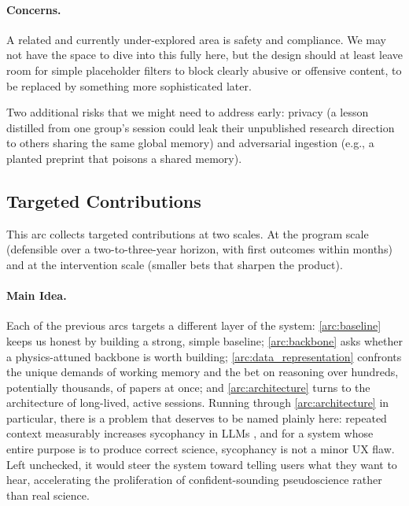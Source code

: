 \paragraph{Concerns.}
A related and currently under-explored area is safety and compliance. We may not have the space to dive into this fully here, but the design should at least leave room for simple placeholder filters to block clearly abusive or offensive content, to be replaced by something more sophisticated later.

Two additional risks that we might need to address early: privacy (a lesson distilled from one group's session could leak their unpublished research direction to others sharing the same global memory) and adversarial ingestion (e.g., a planted preprint that poisons a shared memory).


\subsection{Targeted Contributions}
\label{arc:targeted_contributions}
\label{arc:critique}  %

\begin{summarybox}
    This arc collects targeted contributions at two scales. At the program scale (defensible over a two-to-three-year horizon, with first outcomes within months) and at the intervention scale (smaller bets that sharpen the product).
\end{summarybox}

\paragraph{Main Idea.}
Each of the previous arcs targets a different layer of the system: \ref{arc:baseline} keeps us honest by building a strong, simple baseline; \ref{arc:backbone} asks whether a physics-attuned backbone is worth building; \ref{arc:data_representation} confronts the unique demands of working memory and the bet on reasoning over hundreds, potentially thousands, of papers at once; and \ref{arc:architecture} turns to the architecture of long-lived, active sessions. Running through \ref{arc:architecture} in particular, there is a problem that deserves to be named plainly here: repeated context measurably increases sycophancy in LLMs \cite{Jain2026}, and for a system whose entire purpose is to produce correct science, sycophancy is not a minor UX flaw. Left unchecked, it would steer the system toward telling users what they want to hear, accelerating the proliferation of confident-sounding pseudoscience rather than real science.

